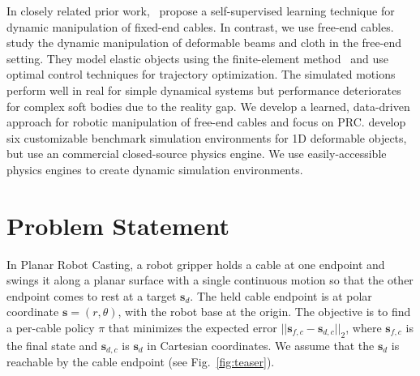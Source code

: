 \documentclass[letterpaper, 10pt, conference]{ieeeconf}  %
\newcommand{\ba}{\mathbf{a}}
\newcommand{\state}{\mathbf{s}}
\begin{document}
In closely related prior work,~\citet{harry_rope_2021} propose a self-supervised learning technique for dynamic manipulation of fixed-end cables.
In contrast, we use free-end cables. \citet{zimmermanndynamic} study the dynamic manipulation of deformable beams and cloth in the free-end setting. They model elastic objects using the finite-element method~\cite{bathe2006finite} and use optimal control techniques for trajectory optimization. 
The simulated motions perform well in real for simple dynamical systems %
but performance deteriorates for complex soft bodies due to the reality gap. %
We develop a learned, data-driven approach for robotic manipulation of free-end cables and focus on PRC.
\citet{9561766} develop six customizable benchmark simulation environments for 1D deformable objects, but use an commercial closed-source physics engine. We use easily-accessible physics engines to create dynamic simulation environments. 



\section{Problem Statement}\label{sec:PS}

In Planar Robot Casting, a robot gripper holds a cable at one endpoint and swings it along a planar surface with a single continuous motion so that the other endpoint comes to rest at a target $\state_d$.
The held cable endpoint is at polar coordinate ${\state=(r, \theta)}$, with the robot base at the origin.
The objective is to find a per-cable policy $\pi$ that minimizes the expected error $||\state_{f, c}-\state_{d, c}||_2$, where $\state_{f, c}$ is the final state and $\state_{d, c}$ is $\state_d$ in Cartesian coordinates. We assume that the $\state_d$ is reachable by the cable endpoint (see Fig.~\ref{fig:teaser}).
\end{document}
